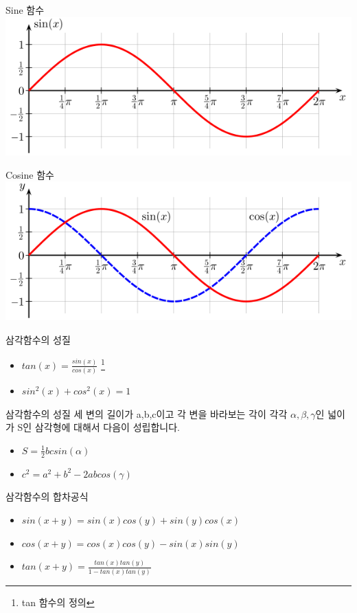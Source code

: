 \documentclass{beamer}
\begin{document}
\begin{frame}{Sine 함수}
\includegraphics[width=\textwidth]{sin}
\end{frame}

\begin{frame}{Cosine 함수}
\includegraphics[width=\textwidth]{cos}
\end{frame}

\begin{frame}{삼각함수의 성질}
\begin{itemize}
\item $tan(x) = \frac{sin(x)}{cos(x)}$ \footnote{tan 함수의 정의}
\item $sin^2(x) + cos^2(x) = 1$
\end{itemize}
\end{frame}

\begin{frame}{삼각함수의 성질}
세 변의 길이가 a,b,c이고 각 변을 바라보는 각이 각각 $\alpha, \beta, \gamma$인 넓이가 S인 삼각형에 대해서 다음이 성립합니다. 
\begin{itemize}
\item $S = \frac{1}{2} bc sin(\alpha)$
\item $c^2 = a^2 + b^2 - 2ab cos(\gamma)$
\end{itemize}
\end{frame}

\begin{frame}{삼각함수의 합차공식}

\begin{itemize}
\item $sin(x+y) = sin(x)cos(y) + sin(y)cos(x)$
\item $cos(x+y) = cos(x)cos(y) - sin(x)sin(y)$
\item $tan(x+y) = \frac{tan(x)tan(y)}{1-tan(x)tan(y)}$
\end{itemize}
\end{frame}
\end{document}

